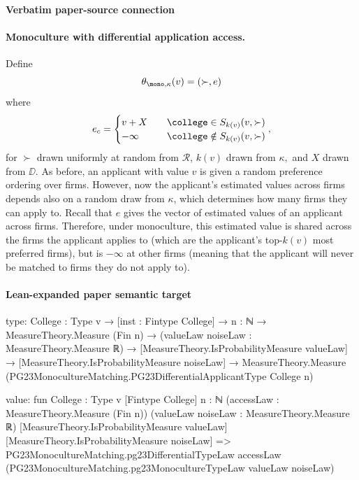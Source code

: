 \documentclass[10pt]{article}
\begin{document}
\paragraph{Verbatim paper-source connection}
\begin{ReviewVerbatim}
\paragraph{Monoculture with differential application access.} Define
\begin{equation}
    \theta_{\mono, \kappa}(v) = (\succ, e)
\end{equation}
where
\begin{equation}
    e_c =
    \begin{cases}
        v + X &\quad \college\in S_{k(v)}(v, \succ)\\
        -\infty &\quad \college\notin S_{k(v)}(v, \succ)
    \end{cases},
\end{equation}
for $\succ$ drawn uniformly at random from $\mathcal{R}$, $k(v)$ drawn from $\kappa,$ and $X$ drawn from $\DD$. As before, an applicant with value $v$ is given a random preference ordering over firms. However, now the applicant's estimated values across firms depends also on a random draw from $\kappa$, which determines how many firms they can apply to. Recall that $e$ gives the vector of estimated values of an applicant across firms. Therefore, under monoculture, this estimated value is shared across the firms the applicant applies to (which are the applicant's top-$k(v)$ most preferred firms), but is $-\infty$ at other firms (meaning that the applicant will never be matched to firms they do not apply to).
\end{ReviewVerbatim}



\paragraph{Lean-expanded paper semantic target}
\begin{ReviewVerbatim}
type:
{College : Type v} →
  [inst : Fintype College] →
    {n : ℕ} →
      MeasureTheory.Measure (Fin n) →
        (valueLaw noiseLaw : MeasureTheory.Measure ℝ) →
          [MeasureTheory.IsProbabilityMeasure valueLaw] →
            [MeasureTheory.IsProbabilityMeasure noiseLaw] →
              MeasureTheory.Measure (PG23MonocultureMatching.PG23DifferentialApplicantType College n)

value:
fun {College : Type v} [Fintype College] {n : ℕ} (accessLaw : MeasureTheory.Measure (Fin n))
    (valueLaw noiseLaw : MeasureTheory.Measure ℝ) [MeasureTheory.IsProbabilityMeasure valueLaw]
    [MeasureTheory.IsProbabilityMeasure noiseLaw] =>
  PG23MonocultureMatching.pg23DifferentialTypeLaw accessLaw
    (PG23MonocultureMatching.pg23MonocultureTypeLaw valueLaw noiseLaw)
\end{ReviewVerbatim}
\end{document}
